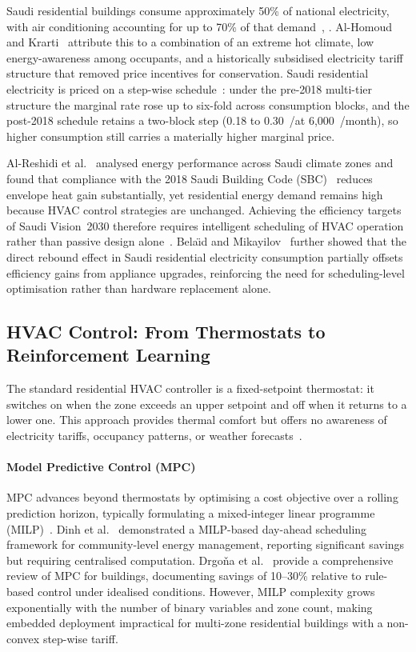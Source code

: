 \documentclass[3p,number]{elsarticle}
\let\oldsubsection\subsection
\renewcommand{\subsection}{\FloatBarrier\oldsubsection}
\newcommand{\SAR}{\text{SAR}}
\newcommand{\kWh}{\text{kWh}}
\begin{document}
Saudi residential buildings consume approximately 50\% of national electricity, with air conditioning accounting for up to 70\% of that demand~\cite{AlHomoud2021}, \cite{Krarti2020}.
Al-Homoud and Krarti~\cite{AlHomoud2021} attribute this to a combination of an extreme hot climate, low energy-awareness among occupants, and a historically subsidised electricity tariff structure that removed price incentives for conservation.
Saudi residential electricity is priced on a step-wise schedule~\cite{Nahiduzzaman2023,SEC2024}: under the pre-2018 multi-tier structure the marginal rate rose up to six-fold across consumption blocks, and the post-2018 schedule retains a two-block step (0.18 to 0.30~\SAR/\kWh at 6{,}000~\kWh/month), so higher consumption still carries a materially higher marginal price.
 
Al-Reshidi et al.~\cite{AlReshidi2024} analysed energy performance across Saudi climate zones and found that compliance with the 2018 Saudi Building Code (SBC)~\cite{Alayed2021} reduces envelope heat gain substantially, yet residential energy demand remains high because HVAC control strategies are unchanged.
Achieving the efficiency targets of Saudi Vision~2030 therefore requires intelligent scheduling of HVAC operation rather than passive design alone~\cite{Belaid2025}.
Bela\"{\i}d and Mikayilov~\cite{Belaid2024} further showed that the direct rebound effect in Saudi residential electricity consumption partially offsets efficiency gains from appliance upgrades, reinforcing the need for scheduling-level optimisation rather than hardware replacement alone.
 
\subsection{HVAC Control: From Thermostats to Reinforcement Learning}
 
The standard residential HVAC controller is a fixed-setpoint thermostat: it switches on when the zone exceeds an upper setpoint and off when it returns to a lower one.
This approach provides thermal comfort but offers no awareness of electricity tariffs, occupancy patterns, or weather forecasts~\cite{Alotaibi2024}.
 
\paragraph{Model Predictive Control (MPC)}
MPC advances beyond thermostats by optimising a cost objective over a rolling prediction horizon, typically formulating a mixed-integer linear programme (MILP)~\cite{Risbeck2017}.
Dinh et al.~\cite{Dinh2022} demonstrated a MILP-based day-ahead scheduling framework for community-level energy management, reporting significant savings but requiring centralised computation.
Drgoňa et al.~\cite{Drgona2020} provide a comprehensive review of MPC for buildings, documenting savings of 10--30\% relative to rule-based control under idealised conditions.
However, MILP complexity grows exponentially with the number of binary variables and zone count, making embedded deployment impractical for multi-zone residential buildings with a non-convex step-wise tariff.
 
\end{document}
